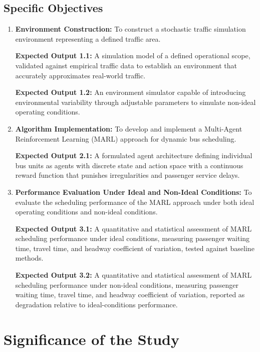 \subsection{Specific Objectives}
\begin{enumerate}
   \item \textbf{Environment Construction:} To construct a stochastic traffic simulation environment representing a defined traffic area.

   \textbf{Expected Output 1.1:} A simulation model of a defined operational scope, validated against empirical traffic data to establish an environment that accurately approximates real-world traffic.

   \textbf{Expected Output 1.2:} An environment simulator capable of introducing environmental variability through adjustable parameters to simulate non-ideal operating conditions.

   \item \textbf{Algorithm Implementation:} To develop and implement a Multi-Agent Reinforcement Learning (MARL) approach for dynamic bus scheduling.

   \textbf{Expected Output 2.1:} A formulated agent architecture defining individual bus units as agents with discrete state and action space with a continuous reward function that punishes irregularities and passenger service delays.

   \item \textbf{Performance Evaluation Under Ideal and Non-Ideal Conditions:} To evaluate the scheduling performance of the MARL approach under both ideal operating conditions and non-ideal conditions.

   \textbf{Expected Output 3.1:} A quantitative and statistical assessment of MARL scheduling performance under ideal conditions, measuring passenger waiting time, travel time, and headway coefficient of variation, tested against baseline methods.

   \textbf{Expected Output 3.2:} A quantitative and statistical assessment of MARL scheduling performance under non-ideal conditions, measuring passenger waiting time, travel time, and headway coefficient of variation, reported as degradation relative to ideal-conditions performance.
\end{enumerate}

\section{Significance of the Study}


